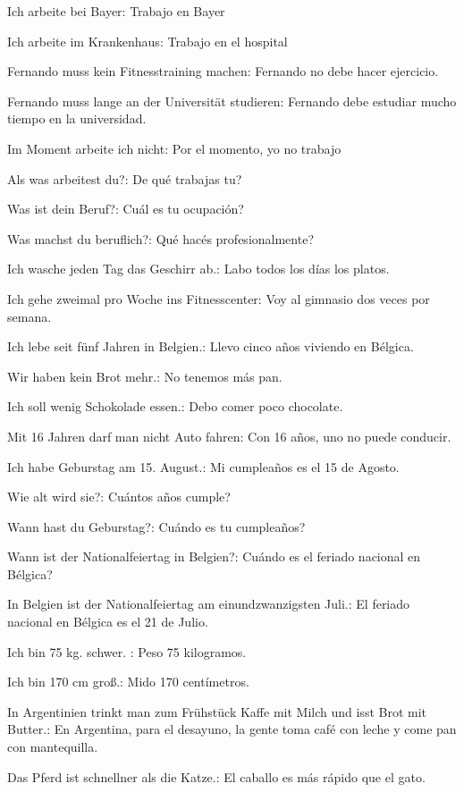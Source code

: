 \begin{myitemize}
\item Ich arbeite bei Bayer: Trabajo en Bayer
\item Ich arbeite im Krankenhaus: Trabajo en el hospital
\item Fernando muss kein Fitnesstraining machen: Fernando no debe hacer ejercicio.
\item Fernando muss lange an der Universität studieren: Fernando debe estudiar mucho tiempo en la universidad.
\item Im Moment arbeite ich nicht: Por el momento, yo no trabajo
\item Als was arbeitest du?: De qué trabajas tu?
\item Was ist dein Beruf?: Cuál es tu ocupación?
\item Was machst du beruflich?: Qué hacés profesionalmente?
\item Ich wasche jeden Tag das Geschirr ab.: Labo todos los días los platos.
\item Ich gehe zweimal pro Woche ins Fitnesscenter: Voy al gimnasio dos veces por semana.
\item Ich lebe seit fünf Jahren in Belgien.: Llevo cinco años viviendo en Bélgica.
\item Wir haben kein Brot mehr.: No tenemos más pan.
\item Ich soll wenig Schokolade essen.: Debo comer poco chocolate.
\item Mit 16 Jahren darf man nicht Auto fahren: Con 16 años, uno no puede conducir.
\item Ich habe Geburstag am 15. August.: Mi cumpleaños es el 15 de Agosto.
\item Wie alt wird sie?: Cuántos años cumple?
\item Wann hast du Geburstag?: Cuándo es tu cumpleaños?
\item Wann ist der Nationalfeiertag in Belgien?: Cuándo es el feriado nacional en Bélgica?
\item In Belgien ist der Nationalfeiertag am einundzwanzigsten Juli.: El feriado nacional en Bélgica es el 21 de Julio.
\item Ich bin 75 kg. schwer. : Peso 75 kilogramos.
\item Ich bin 170 cm groß.: Mido 170 centímetros.
\item In Argentinien trinkt man zum Frühstück Kaffe mit Milch und isst Brot mit Butter.: En Argentina, para el desayuno, la gente toma café con leche y come pan con mantequilla.
\item Das Pferd ist schnellner als die Katze.: El caballo es más rápido que el gato.

\end{myitemize}
